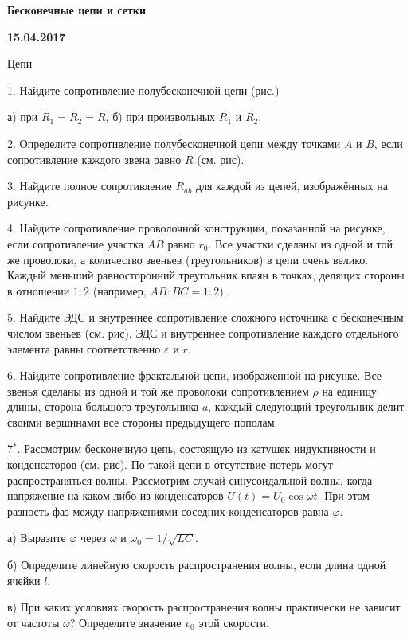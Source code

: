 \documentclass[14pt]{article}
\begin{document}
\begin{center}
\Large{\textbf{Бесконечные цепи и сетки}}

\textbf{15.04.2017}

\vspace{5mm}
\end{center}
{\large{Цепи}}
\vspace{3mm}

1. Найдите сопротивление полубесконечной цепи (рис.)

а) при $R_1=R_2=R$,
\hspace{5cm}
б) при произвольных $R_1$ и $R_2$.

2. Определите сопротивление полубесконечной цепи между точками $A$ и $B$, если сопротивление каждого звена равно $R$ (см. рис).

3. Найдите полное сопротивление $R_{ab}$ для каждой из цепей, изображённых на рисунке.

4. Найдите сопротивление проволочной конструкции, показанной на рисунке, если сопротивление участка $AB$ равно $r_0$. Все участки сделаны из одной и той же проволоки, а количество звеньев (треугольников) в цепи очень велико. Каждый меньший равносторонний треугольник впаян в точках, делящих стороны в отношении $1:2$ (например, $AB:BC=1:2$).

5. Найдите ЭДС и внутреннее сопротивление сложного источника с бесконечным числом звеньев (см. рис). ЭДС и внутреннее сопротивление каждого отдельного элемента равны соответственно $\varepsilon$ и $r$.

6. Найдите сопротивление фрактальной цепи, изображенной на рисунке. Все звенья сделаны из одной и той же проволоки сопротивлением $\rho$ на единицу длины, сторона большого треугольника $a$, каждый следующий треугольник делит своими вершинами все стороны предыдущего пополам.

7$^*$. Рассмотрим бесконечную цепь, состоящую из катушек индуктивности и конденсаторов (см. рис). По такой цепи в отсутствие потерь могут распространяться волны. Рассмотрим случай синусоидальной волны, когда напряжение на каком-либо из конденсаторов $U(t)=U_0\cos\omega t$. При этом разность фаз между напряжениями соседних конденсаторов равна $\varphi$.

а) Выразите $\varphi$ через $\omega$ и $\omega_0=1/\sqrt{LC}$.

б) Определите линейную скорость распространения волны, если длина одной ячейки $l$.

в) При каких условиях скорость распространения волны практически не зависит от частоты $\omega$? Определите значение $v_0$ этой скорости.
\end{document}
